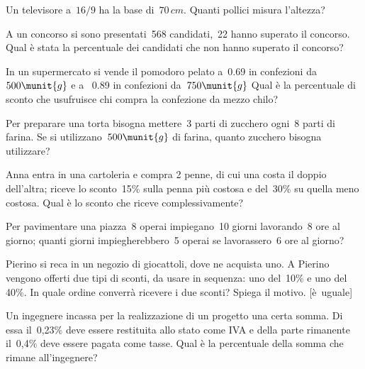 \begin{htmulticols}{2}
\begin{esercizio}
Un televisore a~\(16/9\) ha la base di~\(70\,cm\).
Quanti pollici misura l'altezza?\\
\end{esercizio}

\begin{esercizio}
A un concorso si sono presentati~568 candidati,~22 hanno superato il
concorso. Qual è stata la percentuale dei candidati che non hanno
superato il concorso?
\end{esercizio}

\begin{esercizio}
In un supermercato si vende il pomodoro pelato a \officialeuro\,0.69 in
confezioni da~\(500\munit{g}\) e a \officialeuro~0.89 in confezioni
da~\(750\munit{g}\) 
Qual è la percentuale di sconto che usufruisce chi compra la confezione da 
mezzo chilo?
\end{esercizio}

\begin{esercizio}
Per preparare una torta bisogna mettere~3 parti di zucchero ogni~8
parti di farina. Se si utilizzano~\(500\munit{g}\) di farina,
quanto zucchero bisogna utilizzare?
\end{esercizio}

\begin{esercizio}
Anna entra in una cartoleria e compra 2 penne, di cui una costa il
doppio dell'altra; riceve lo sconto~15\% sulla penna
più costosa e del~30\% su quella meno costosa. Qual è lo sconto che
riceve complessivamente?
\end{esercizio}

\begin{esercizio}
Per pavimentare una piazza~8 operai impiegano~10 giorni
lavorando~8 ore al giorno; quanti giorni impiegherebbero~5 operai se
lavorassero~6 ore al giorno?
\end{esercizio}

\begin{esercizio}
Pierino si reca in un negozio di giocattoli, dove ne acquista uno. A
Pierino vengono offerti due tipi di sconti, da usare in sequenza: uno 
del~10\% e uno del 40\%. 
In quale ordine converrà ricevere i due sconti? Spiega il motivo.
\hfill [è~uguale]
\end{esercizio}

\begin{esercizio}
Un ingegnere incassa per la realizzazione di un progetto una
certa somma. Di essa il~0,23\% deve essere restituita allo stato come IVA
e della parte rimanente il~0,4\% deve essere pagata come tasse.
Qual è la percentuale della somma che rimane all'ingegnere?\\
\end{esercizio}


\end{htmulticols}
